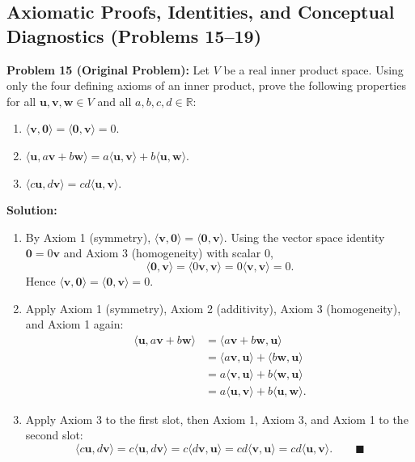 \documentclass[11pt, letterpaper]{article}
\theoremstyle{definition}
\theoremstyle{remark}
\begin{document}
\subsection{Axiomatic Proofs, Identities, and Conceptual Diagnostics (Problems 15--19)}

\textbf{Problem 15 (Original Problem):} Let $V$ be a real inner product space. Using only the four defining axioms of an inner product, prove the following properties for all $\mathbf{u}, \mathbf{v}, \mathbf{w} \in V$ and all $a, b, c, d \in \mathbb{R}$:
\begin{enumerate}[label=(\alph*)]
    \item $\langle \mathbf{v}, \mathbf{0} \rangle = \langle \mathbf{0}, \mathbf{v} \rangle = 0$.
    \item $\langle \mathbf{u}, a\mathbf{v} + b\mathbf{w} \rangle = a\langle \mathbf{u}, \mathbf{v} \rangle + b\langle \mathbf{u}, \mathbf{w} \rangle$.
    \item $\langle c\mathbf{u}, d\mathbf{v} \rangle = cd\langle \mathbf{u}, \mathbf{v} \rangle$.
\end{enumerate}

\textbf{Solution:}
\begin{enumerate}[label=(\alph*)]
    \item By Axiom 1 (symmetry), $\langle \mathbf{v}, \mathbf{0} \rangle = \langle \mathbf{0}, \mathbf{v} \rangle$. Using the vector space identity $\mathbf{0} = 0\mathbf{v}$ and Axiom 3 (homogeneity) with scalar $0$,
    \[
    \langle \mathbf{0}, \mathbf{v} \rangle = \langle 0\mathbf{v}, \mathbf{v} \rangle = 0\langle \mathbf{v}, \mathbf{v} \rangle = 0.
    \]
    Hence $\langle \mathbf{v}, \mathbf{0} \rangle = \langle \mathbf{0}, \mathbf{v} \rangle = 0$.
    \item Apply Axiom 1 (symmetry), Axiom 2 (additivity), Axiom 3 (homogeneity), and Axiom 1 again:
    \begin{align*}
    \langle \mathbf{u}, a\mathbf{v} + b\mathbf{w} \rangle &= \langle a\mathbf{v} + b\mathbf{w}, \mathbf{u} \rangle \\
    &= \langle a\mathbf{v}, \mathbf{u} \rangle + \langle b\mathbf{w}, \mathbf{u} \rangle \\
    &= a\langle \mathbf{v}, \mathbf{u} \rangle + b\langle \mathbf{w}, \mathbf{u} \rangle \\
    &= a\langle \mathbf{u}, \mathbf{v} \rangle + b\langle \mathbf{u}, \mathbf{w} \rangle.
    \end{align*}
    \item Apply Axiom 3 to the first slot, then Axiom 1, Axiom 3, and Axiom 1 to the second slot:
    \[
    \langle c\mathbf{u}, d\mathbf{v} \rangle = c\langle \mathbf{u}, d\mathbf{v} \rangle = c\langle d\mathbf{v}, \mathbf{u} \rangle = cd\langle \mathbf{v}, \mathbf{u} \rangle = cd\langle \mathbf{u}, \mathbf{v} \rangle. \qquad \blacksquare
    \]
\end{enumerate}
\end{document}
